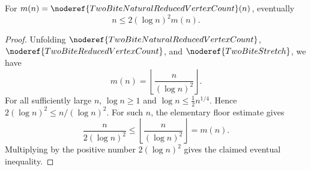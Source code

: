 \begin{helper}
For \(m(n)=\noderef{TwoBiteNaturalReducedVertexCount}(n)\), eventually
\[
n\le 2(\log n)^2 m(n).
\]
\end{helper}
\begin{proof}
Unfolding \(\noderef{TwoBiteNaturalReducedVertexCount}\),
\(\noderef{TwoBiteReducedVertexCount}\), and
\(\noderef{TwoBiteStretch}\), we have
\[
m(n)=\left\lfloor \frac{n}{(\log n)^2}\right\rfloor .
\]
For all sufficiently large \(n\), \(\log n\ge 1\) and
\(\log n\le \frac12 n^{1/4}\).  Hence \(2(\log n)^2\le n/(\log n)^2\).
For such \(n\), the elementary floor estimate gives
\[
\frac{n}{2(\log n)^2}\le
\left\lfloor \frac{n}{(\log n)^2}\right\rfloor = m(n).
\]
Multiplying by the positive number \(2(\log n)^2\) gives the claimed
eventual inequality.
\end{proof}
